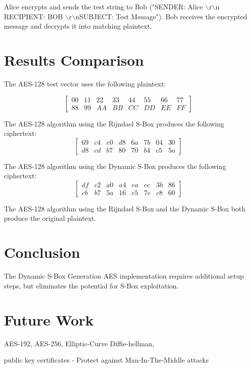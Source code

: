 \documentclass[journal]{IEEEtran}
\begin{document}
Alice encrypts and sends the test string to Bob ("SENDER: Alice $\backslash$r$\backslash$n RECIPIENT: BOB $\backslash$r$\backslash$nSUBJECT: Test Message"). Bob receives the encrypted message and decrypts it into matching plaintext. 

\section{Results Comparison}
The AES-128 test vector uses the following plaintext:

$$
\begin{bmatrix}
00 & 11 & 22 & 33 & 44 & 55 & 66 & 77 \\
88 & 99 & AA & BB & CC & DD & EE & FF
\end{bmatrix}
$$

The AES-128 algorithm using the Rijndael S-Box produces the following ciphertext:
$$
\begin{bmatrix}
69 & c4 & e0 & d8 & 6a & 7b & 04 & 30 \\
d8 & cd & b7 & 80 & 70 & b4 & c5 & 5a
\end{bmatrix}
$$

The AES-128 algorithm using the Dynamic S-Box produces the following ciphertext:
$$
\begin{bmatrix}
 df & c2 & a0 & a4 & ea & cc & 3b & 86 \\
cb & b7 & 5a & 16 & c5 & 7e & c8 & 60
\end{bmatrix}
$$

The AES-128 algorithm using the Rijndael S-Box and the Dynamic S-Box both produce the original plaintext.

\section{Conclusion}
The Dynamic S-Box Generation AES implementation requires additional setup steps, but eliminates the potential for S-Box exploitation. 

\section{Future Work}
AES-192, AES-256, Elliptic-Curve Diffie-hellman, 

public key certificates - Protect against Man-In-The-Middle attacks


\end{document}
